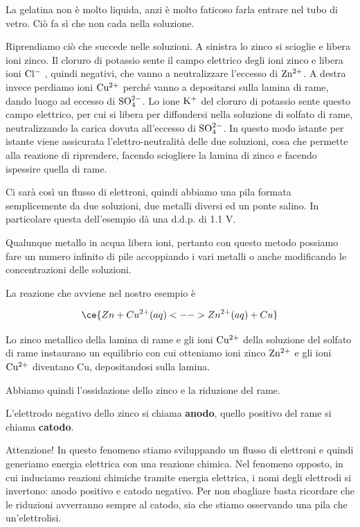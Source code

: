 La gelatina non è molto liquida, anzi è molto faticoso farla entrare nel tubo di vetro. Ciò fa sì che non cada nella soluzione.

Riprendiamo ciò che succede nelle soluzioni. A sinistra lo zinco si scioglie e libera ioni zinco. Il cloruro di potassio sente il campo elettrico degli ioni zinco e libera ioni $\rm Cl^-$ , quindi negativi, che vanno a neutralizzare l'eccesso di $\rm Zn^{2+}$. A destra invece perdiamo ioni $\rm Cu^{2+}$ perché vanno a depositarsi sulla lamina di rame, dando luogo ad eccesso di $\rm SO_4^{2-}$. Lo ione $\rm K^+$ del cloruro di potassio sente questo campo elettrico, per cui si libera per diffondersi nella soluzione di solfato di rame, neutralizzando la carica dovuta all'eccesso di $\rm SO_4^{2-}$. In questo modo istante per istante viene assicurata l'elettro-neutralità delle due soluzioni, cosa che permette alla reazione di riprendere, facendo sciogliere la lamina di zinco e facendo ispessire quella di rame.

Ci sarà così un flusso di elettroni, quindi abbiamo una pila formata semplicemente da due soluzioni, due metalli diversi ed un ponte salino. In particolare questa dell'esempio dà una d.d.p. di 1.1 V.

Qualunque metallo in acqua libera ioni, pertanto con questo metodo possiamo fare un numero infinito di pile accoppiando i vari metalli o anche modificando le concentrazioni delle soluzioni.

La reazione che avviene nel nostro esempio è

$$\ce{Zn + Cu^{2+}(aq) <--> Zn^{2+}(aq) + Cu}$$

Lo zinco metallico della lamina di rame e gli ioni $\rm Cu^{2+}$ della soluzione del solfato di rame instaurano un equilibrio con cui otteniamo ioni zinco $\rm Zn^{2+}$ e gli ioni $\rm Cu^{2+}$ diventano Cu, depositandosi sulla lamina.

Abbiamo quindi l'ossidazione dello zinco e la riduzione del rame.

L'elettrodo negativo dello zinco si chiama \textbf{anodo}, quello positivo del rame si chiama \textbf{catodo}.

Attenzione! In questo fenomeno stiamo sviluppando un flusso di elettroni e quindi generiamo energia elettrica con una reazione chimica. Nel fenomeno opposto, in cui induciamo reazioni chimiche tramite energia elettrica, i nomi degli elettrodi si invertono: anodo positivo e catodo negativo. Per non sbagliare basta ricordare che le riduzioni avverranno sempre al catodo, sia che stiamo osservando una pila che un'elettrolisi.

